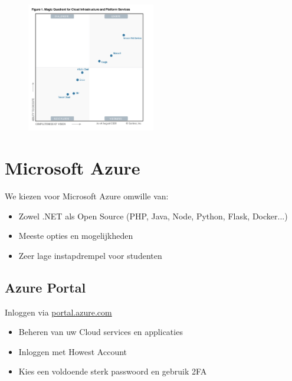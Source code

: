 \documentclass{article}
\begin{document}
\begin{figure}[H]
    \centering
    \includegraphics[width=0.5\textwidth]{magic-quadrant.png}
    \caption{}
\end{figure}



\section{Microsoft Azure}
We kiezen voor Microsoft Azure omwille van:
\begin{itemize}
    \item Zowel .NET als Open Source (PHP, Java, Node, Python, Flask, Docker...)
    \item Meeste opties en mogelijkheden
    \item Zeer lage instapdrempel voor studenten
\end{itemize}


\subsection{Azure Portal}

Inloggen via \url{portal.azure.com}

\begin{itemize}
    \item Beheren van uw Cloud services en applicaties
    \item Inloggen met Howest Account
    \item Kies een voldoende sterk passwoord en gebruik 2FA
\end{itemize}
\end{document}

